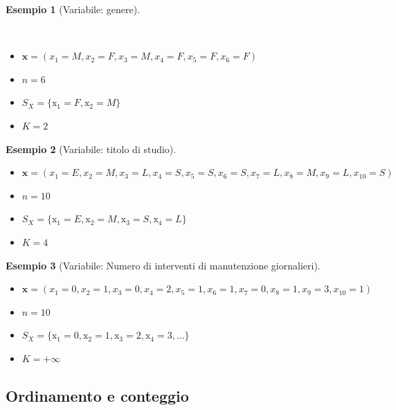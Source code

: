 \documentclass[
  11pt,
]{book}
\providecommand{\tightlist}{%
  \setlength{\itemsep}{0pt}\setlength{\parskip}{0pt}}
\theoremstyle{mytheoremstyle}
\theoremstyle{mydefstyle}
\newtheorem{example}{{Esempio}}[section]
\begin{document}
\begin{example}[Variabile: genere]
\protect\hypertarget{exm:vg}{}\label{exm:vg}

\(\phantom{.}\)

\begin{itemize}
\tightlist
\item
  \(\mathbf{x}=(x_1 = M, x_2 =F, x_3 =M, x_4=F,x_5=F,x_6=F)\)
\item
  \(n=6\)
\item
  \(S_X=\{\mathrm{x}_1 = F,\mathrm{x}_2 = M\}\)
\item
  \(K=2\)
\end{itemize}

\end{example}

\begin{example}[Variabile: titolo di studio]

\(\phantom{.}\)

\begin{itemize}
\tightlist
\item
  \(\mathbf{x}=(x_1 = E, x_2 =M, x_3 =L, x_4=S,x_5=S,x_6=S,
  x_7=L,x_8=M,x_9=L,x_{10}=S)\)
\item
  \(n=10\)
\item
  \(S_X=\{\mathrm{x}_1 = E,\mathrm{x}_2 = M, \mathrm{x}_3=S,\mathrm{x}_4=L\}\)
\item
  \(K=4\)
\end{itemize}

\end{example}

\begin{example}[Variabile: Numero di interventi di manutenzione giornalieri]

\(\phantom{.}\)

\begin{itemize}
\tightlist
\item
  \(\mathbf{x}=(x_1 = 0, x_2 =1, x_3 =0, x_4=2,x_5=1,x_6=1,
  x_7=0,x_8=1,x_9=3,x_{10}=1)\)
\item
  \(n=10\)
\item
  \(S_X=\{\mathrm{x}_1 = 0,\mathrm{x}_2 = 1,\mathrm{x}_3=2,\mathrm{x}_4=3,...\}\)
\item
  \(K=+\infty\)
\end{itemize}

\end{example}

\subsection{Ordinamento e conteggio}\label{ordinamento-e-conteggio}
\end{document}
